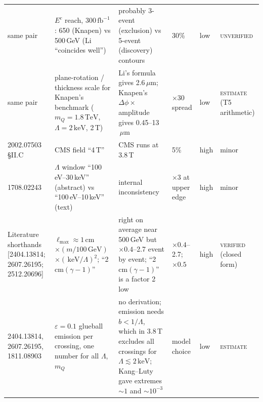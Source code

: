 \documentclass[11pt,a4paper]{article}
\newcommand{\EST}{\textsc{estimate}}
\newcommand{\UNV}{\textsc{unverified}}
\newcommand{\VER}{\textsc{verified}}
\newcommand{\mQ}{m_Q}
\newcommand{\GeV}{\ensuremath{\,\mathrm{GeV}}}
\newcommand{\TeV}{\ensuremath{\,\mathrm{TeV}}}
\newcommand{\keV}{\ensuremath{\,\mathrm{keV}}}
\newcommand{\fbinv}{\ensuremath{\,\mathrm{fb}^{-1}}}
\newcommand{\um}{\ensuremath{\,\mu\mathrm{m}}}
\newcommand{\lmax}{\ell_{\max}}
\begin{document}
{\begin{longtable}{@{}L{2.2cm}L{3.4cm}L{4.4cm}L{2.0cm}L{1.3cm}L{1.9cm}@{}}
same pair & $E^c$ reach, 300\fbinv: 650 (Knapen) vs 500\,GeV (Li ``coincides well'') & probably 3-event (exclusion) vs 5-event (discovery) contours & 30\% & low & \UNV{}\\
same pair & plane-rotation / thickness scale for Knapen's benchmark ($\mQ=1.8\TeV$, $\Lambda=2\keV$, 2\,T) & Li's formula gives 2.6\um; Knapen's $\Delta\phi\times$ amplitude gives 0.45--13\um & $\times30$ spread & low & \EST{} (T5 arithmetic)\\
2002.07503 \S II.C & CMS field ``4\,T'' & CMS runs at 3.8\,T & 5\% & high & minor\\
1708.02243 & $\Lambda$ window ``100\,eV--30\,keV'' (abstract) vs ``100\,eV--10\,keV'' (text) & internal inconsistency & $\times3$ at upper edge & high & minor\\
Literature shorthands [2404.13814; 2607.26195; 2512.20696] & $\lmax\approx1$\,cm $\times(m/100\GeV)$ $\times(\keV/\Lambda)^2$; ``2\,cm$(\gamma-1)$'' & right on average near 500\,GeV but $\times0.4$--2.7 event by event; ``2\,cm$(\gamma-1)$'' is a factor 2 low & $\times0.4$--2.7; $\times0.5$ & high & \VER{} (closed form)\\
2404.13814, 2607.26195, 1811.08903 & $\varepsilon=0.1$ glueball emission per crossing, one number for all $\Lambda$, $\mQ$ & no derivation; emission needs $b<1/\Lambda$, which in 3.8\,T excludes all crossings for $\Lambda\lesssim2\keV$; Kang--Luty gave extremes $\sim1$ and $\sim10^{-3}$ & model choice & low & \EST{}\\
\end{longtable}
}
\end{document}

